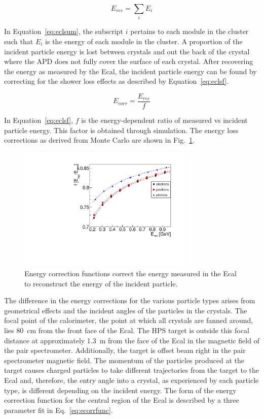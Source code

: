 \begin{equation}
\label{eq:eclsum}
E_{rec} = \sum_i E_i    
\end{equation}

In Equation~\eqref{eq:eclsum}, the subscript $i$ pertains to each module in the cluster such that $E_i$ is the energy of each module in the cluster. A proportion of the incident particle energy is lost between crystals and out the back of the crystal where the APD does not fully cover the surface of each crystal. After recovering the energy as measured by the Ecal, the incident particle energy can be found by correcting for the shower loss effects as described by Equation~\eqref{eq:eclsf}.

\begin{equation}
\label{eq:eclsf}
E_{corr} = \dfrac{E_{rec}}{f}   
\end{equation}

In Equation~\eqref{eq:eclsf}, $f$ is the energy-dependent ratio of measured vs incident particle energy. This factor is obtained through simulation. The energy loss corrections as derived from Monte Carlo are shown in Fig.~\ref{Figure:ecorr}.

\begin{figure}[thb]
  \centering
      \includegraphics[width=0.75\textwidth]{pics/performance/energycorrection.pdf}
  \caption[Ecal energy shower correction functions from simulation]{Energy correction functions correct the energy measured in the Ecal to reconstruct the energy of the incident particle.}
  \label{Figure:ecorr}
\end{figure}

The difference in the energy corrections for the various particle types arises from geometrical effects and the incident angles of the particles in the crystals. The focal point of the calorimeter, the point at which all crystals are fanned around, lies 80~cm from the front face of the Ecal. The HPS target is outside this focal distance at approximately 1.3~m from the face of the Ecal in the magnetic field of the pair spectrometer. Additionally, the target is offset beam right in the pair spectrometer magnetic field. The momentum of the particles produced at the target causes charged particles to take different trajectories from the target to the Ecal and, therefore, the entry angle into a crystal, as experienced by each particle type, is different depending on the incident energy. The form of the energy correction function for the central region of the Ecal is described by a three parameter fit in Eq.~\eqref{eq:ecorrfunc}.

